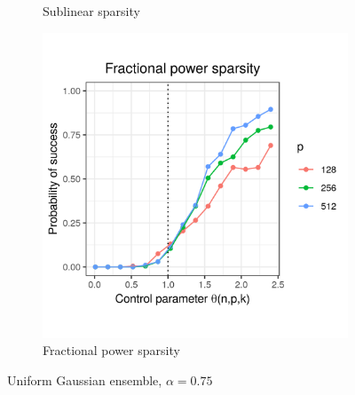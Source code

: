 \documentclass[letterpaper,12pt]{article}
\begin{document}
\begin{figure}[h]
\begin{subfigure}{0.32\textwidth}
    \caption{Sublinear sparsity}
    \label{fig:uniform_sublinear_sparsity_alpha_1}
  \end{subfigure}
  \begin{subfigure}{0.32\textwidth}
    \includegraphics[width=0.9\linewidth]{uniform_fractional_power_sparsity_alpha_075}
    \caption{Fractional power sparsity}
    \label{fig:uniform_fractional_power_sparsity_alpha_1}
  \end{subfigure}
  \caption{Uniform Gaussian ensemble, $\alpha = 0.75$}
  \label{fig:uniform_alpha_075}
\end{figure}
\end{document}
